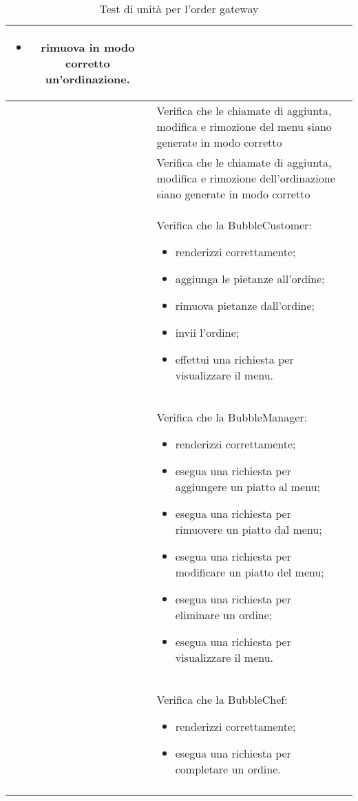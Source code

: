 \begin{longtable}{|c|P{9cm}|c|}
\begin{itemize}
		\item rimuova in modo corretto un'ordinazione.
	\end{itemize}
	 \\
	\hline{} & Verifica che le chiamate di aggiunta, modifica e rimozione del menu siano generate in modo corretto \\
	\hline{} & Verifica che le chiamate di aggiunta, modifica e rimozione dell'ordinazione siano generate in modo corretto \\
	\hline {} & Verifica che la BubbleCustomer:
	\begin{itemize}
		\item renderizzi correttamente;
		\item aggiunga le pietanze all'ordine;
		\item rimuova pietanze dall'ordine;
		\item invii l'ordine;
		\item effettui una richiesta per visualizzare il menu.
	\end{itemize}
	 \\
	\hline {} & Verifica che la BubbleManager:
	\begin{itemize}
		\item renderizzi correttamente;
		\item esegua una richiesta per aggiungere un piatto al menu;
		\item esegua una richiesta per rimuovere un piatto dal menu;
		\item esegua una richiesta per modificare un piatto del menu;
		\item esegua una richiesta per eliminare un ordine;
		\item esegua una richiesta per visualizzare il menu.
	\end{itemize}
	\\
		\hline {} & Verifica che la BubbleChef:
	\begin{itemize}
		\item renderizzi correttamente;
		\item esegua una richiesta per completare un ordine.
	\end{itemize}
	 \\
	\hline
	\caption{Test di unità per l'order gateway}
\end{longtable}

